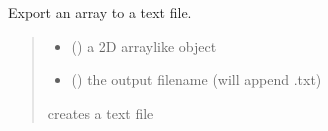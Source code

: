 \documentclass[letterpaper,12pt,english]{sphinxmanual}
\begin{document}
\begin{fulllineitems}
\label{\detokenize{api/core:cbmpy.CBTools.exportArray2TXT}}
\pysigstartsignatures
\pysiglinewithargsret
{}
{\sphinxparamcomma {}}
{}
\pysigstopsignatures
\sphinxAtStartPar
Export an array to a text file.
\begin{quote}\begin{description}
\begin{itemize}
\item {} 
\sphinxAtStartPar
{} () \textendash{} a 2D array\sphinxhyphen{}like object

\item {} 
\sphinxAtStartPar
{} () \textendash{} the output filename (will append .txt)

\end{itemize}

\sphinxAtStartPar
{} \textendash{} creates a text file

\end{description}\end{quote}

\end{fulllineitems}

\end{document}
